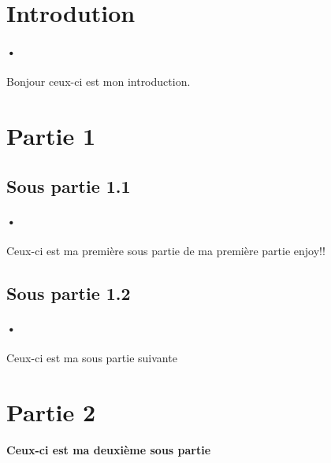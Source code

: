 \section{Introdution}

\paragraph{•}Bonjour ceux-ci est mon introduction.
\newpage

\section{Partie 1}
\subsection{Sous partie 1.1}
\paragraph{•}Ceux-ci est ma première sous partie de ma première partie enjoy!!
\subsection{Sous partie 1.2}
\paragraph{•}Ceux-ci est ma sous partie suivante
\newpage

\section{Partie 2}
\paragraph{Ceux-ci est ma deuxième sous partie}